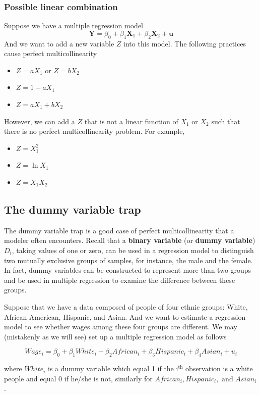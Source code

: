 \documentclass[a4paper,11pt]{article}
\begin{document}
\subsubsection*{Possible linear combination}
\label{sec:orgc068def}
Suppose we have a multiple regression model
\[ \mathbf{Y} = \beta_0 + \beta_1 \mathbf{X}_1 + \beta_2
\mathbf{X}_2 + \mathbf{u}  \]
And we want to add a new variable \(Z\) into this model. The following
practices cause perfect multicollinearity
\begin{itemize}
\item \(Z = a X_1\) or \(Z = b X_2\)
\item \(Z = 1 - a X_1\)
\item \(Z = a X_1 + b X_2\)
\end{itemize}

However, we can add a \(Z\) that is not a linear function of \(X_1\) or
\(X_2\) such that there is no perfect multicollinearity problem. For example,
\begin{itemize}
\item \(Z = X_1^2\)
\item \(Z = \ln X_1\)
\item \(Z = X_1 X_2\)
\end{itemize}

\subsection{The dummy variable trap}
\label{sec:orgd74e155}
The dummy variable trap is a good case of perfect multicollinearity
that a modeler often encounters. Recall that a \textbf{binary variable} (or
\textbf{dummy variable}) \(D_i\), taking values of one or zero, can be used in
a regression model to distinguish two mutually exclusive groups of
samples, for instance, the male and the female. In fact, dummy
variables can be constructed to represent more than two groups and be
used in multiple regression to examine the difference between these
groups.

Suppose that we have a data composed of people of four ethnic groups:
White, African American, Hispanic, and Asian. And we want to estimate
a regression model to see whether wages among these four groups are
different. We may (mistakenly as we will see) set up a multiple
regression model as follows
\begin{LaTeX}
\begin{equation}
\label{eq:dummy-trap}
Wage_i = \beta_0 + \beta_1 White_i + \beta_2 African_i + \beta_3 Hispanic_i + \beta_4 Asian_i + u_i
\end{equation}
\end{LaTeX}
where \(White_i\) is a dummy variable which equal 1 if the i\(^{\text{th}}\)
observation is a white people and equal 0 if he/she is not, similarly
for \(African_i, Hispanic_i, \text{ and } Asian_i\).
\end{document}
